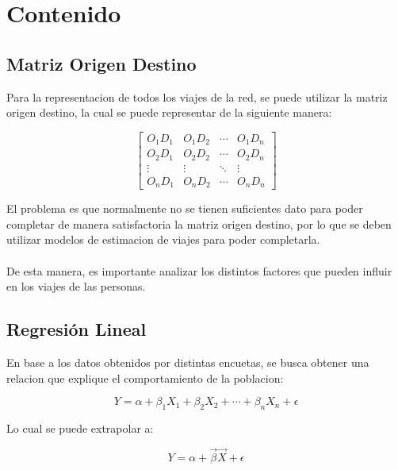 \documentclass[12pt]{article} %
\begin{document}
\section{Contenido}

\subsection{Matriz Origen Destino}

Para la representacion de todos los viajes de la red, se puede utilizar la matriz origen destino, la cual se puede representar de la siguiente manera:

\begin{equation}
    \begin{bmatrix}
        O_{1}D_{1} & O_{1}D_{2} & \cdots & O_{1}D_{n} \\
        O_{2}D_{1} & O_{2}D_{2} & \cdots & O_{2}D_{n} \\
        \vdots & \vdots & \ddots & \vdots \\
        O_{n}D_{1} & O_{n}D_{2} & \cdots & O_{n}D_{n}
    \end{bmatrix}
\end{equation}

El problema es que normalmente no se tienen suficientes dato para poder completar de manera satisfactoria la matriz origen destino, por lo que se deben utilizar modelos de estimacion de viajes para poder completarla.
\\ \\
De esta manera, es importante analizar los distintos factores que pueden influir en los viajes de las personas.

\subsection{Regresión Lineal}

En base a los datos obtenidos por distintas encuetas, se busca obtener una relacion que explique el comportamiento de la poblacion:

\begin{equation}
    Y = \alpha + \beta_{1}X_{1} + \beta_{2}X_{2} + \cdots + \beta_{n}X_{n} + \epsilon
\end{equation}

Lo cual se puede extrapolar a:

\begin{equation}
    Y = \alpha + \vec{\beta}\vec{X} + \epsilon
\end{equation}
\end{document}
